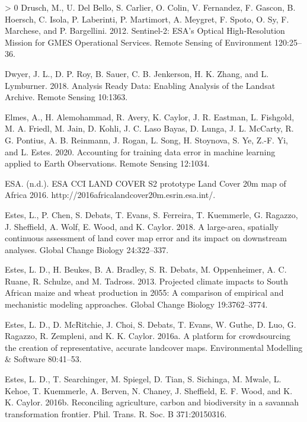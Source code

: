 \documentclass[11pt,a4paper]{article}
\newlength{\cslhangindent}
\newenvironment{CSLReferences}[3] %
 {%
  \setlength{\parindent}{0pt}
  \ifodd #1 \everypar{\setlength{\hangindent}{\cslhangindent}}\ignorespaces\fi
  \ifnum #2 > 0
  \setlength{\parskip}{#2\baselineskip}
  \fi
 }%
 {}
\begin{document}
\begin{CSLReferences}{1}{0}
\leavevmode\hypertarget{ref-DruschSentinel2ESAOptical2012}{}%
Drusch, M., U. Del Bello, S. Carlier, O. Colin, V. Fernandez, F. Gascon,
B. Hoersch, C. Isola, P. Laberinti, P. Martimort, A. Meygret, F. Spoto,
O. Sy, F. Marchese, and P. Bargellini. 2012. Sentinel-2: {ESA}'s
{Optical High}-{Resolution Mission} for {GMES Operational Services}.
Remote Sensing of Environment 120:25--36.

\leavevmode\hypertarget{ref-DwyerAnalysisReadyData2018}{}%
Dwyer, J. L., D. P. Roy, B. Sauer, C. B. Jenkerson, H. K. Zhang, and L.
Lymburner. 2018. Analysis {Ready Data}: Enabling {Analysis} of the
{Landsat Archive}. Remote Sensing 10:1363.

\leavevmode\hypertarget{ref-ElmesAccountingtrainingdata2020}{}%
Elmes, A., H. Alemohammad, R. Avery, K. Caylor, J. R. Eastman, L.
Fishgold, M. A. Friedl, M. Jain, D. Kohli, J. C. Laso Bayas, D. Lunga,
J. L. McCarty, R. G. Pontius, A. B. Reinmann, J. Rogan, L. Song, H.
Stoynova, S. Ye, Z.-F. Yi, and L. Estes. 2020. Accounting for training
data error in machine learning applied to {Earth Observations}. Remote
Sensing 12:1034.

\leavevmode\hypertarget{ref-ESAESACCILAND}{}%
ESA. (n.d.). {ESA CCI LAND COVER} {} {S2} prototype {Land Cover} 20m map
of {Africa} 2016. http://2016africalandcover20m.esrin.esa.int/.

\leavevmode\hypertarget{ref-Esteslargeareaspatiallycontinuous2018}{}%
Estes, L., P. Chen, S. Debats, T. Evans, S. Ferreira, T. Kuemmerle, G.
Ragazzo, J. Sheffield, A. Wolf, E. Wood, and K. Caylor. 2018. A
large-area, spatially continuous assessment of land cover map error and
its impact on downstream analyses. Global Change Biology 24:322--337.

\leavevmode\hypertarget{ref-EstesProjectedclimateimpacts2013}{}%
Estes, L. D., H. Beukes, B. A. Bradley, S. R. Debats, M. Oppenheimer, A.
C. Ruane, R. Schulze, and M. Tadross. 2013. Projected climate impacts to
{South African} maize and wheat production in 2055: A comparison of
empirical and mechanistic modeling approaches. Global Change Biology
19:3762--3774.

\leavevmode\hypertarget{ref-Estesplatformcrowdsourcingcreation2016}{}%
Estes, L. D., D. McRitchie, J. Choi, S. Debats, T. Evans, W. Guthe, D.
Luo, G. Ragazzo, R. Zempleni, and K. K. Caylor. 2016a. A platform for
crowdsourcing the creation of representative, accurate landcover maps.
Environmental Modelling \& Software 80:41--53.

\leavevmode\hypertarget{ref-EstesReconcilingagriculturecarbon2016}{}%
Estes, L. D., T. Searchinger, M. Spiegel, D. Tian, S. Sichinga, M.
Mwale, L. Kehoe, T. Kuemmerle, A. Berven, N. Chaney, J. Sheffield, E. F.
Wood, and K. K. Caylor. 2016b. Reconciling agriculture, carbon and
biodiversity in a savannah transformation frontier. Phil. Trans. R. Soc.
B 371:20150316.


\end{CSLReferences}
\end{document}
